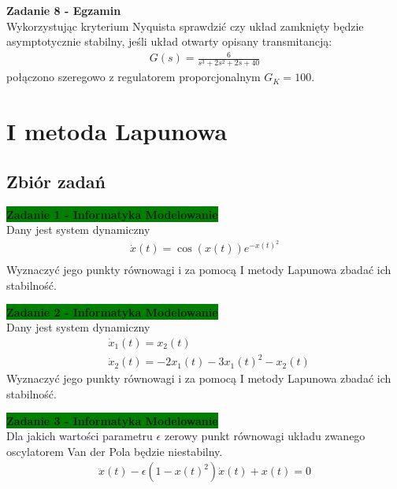 \documentclass[a4paper,11pt]{article}
\begin{document}
\newpage
\begin{framed}
\textbf{Zadanie 8 - Egzamin } \\ 
Wykorzystując kryterium Nyquista sprawdzić czy układ zamknięty będzie asymptotycznie stabilny, jeśli układ otwarty opisany transmitancją:
\begin{align*}
G(s)=\frac{6}{s^3+2s^2+2s+40}
\end{align*}
połączono szeregowo z regulatorem proporcjonalnym \( G_K = 100 \). 
\end{framed}


\newpage
\section{I metoda Lapunowa}
\subsection{Zbiór zadań}
\begin{framed}
\textbf{\colorbox{green}{Zadanie 1 - Informatyka Modelowanie} } \\ 
Dany jest system dynamiczny 
\begin{align*}
\dot{x}(t)=\cos ( x(t) ) e^{-x(t)^{2}} \\
\end{align*}
Wyznaczyć jego punkty równowagi i za pomocą I metody Lapunowa zbadać ich stabilność.
\end{framed}

\begin{framed}
\textbf{\colorbox{green}{Zadanie 2 - Informatyka Modelowanie} } \\ 
Dany jest system dynamiczny 
\begin{align*}
&\dot{x}_{1}(t)=x_{2}(t) \\
&\dot{x}_{2}(t)=-2x_{1}(t)-3x_{1}(t)^{2}-x_{2}(t)
\end{align*}
Wyznaczyć jego punkty równowagi i za pomocą I metody Lapunowa zbadać ich stabilność.
\end{framed}

\begin{framed}
\textbf{\colorbox{green}{Zadanie 3 - Informatyka Modelowanie} } \\ 
Dla jakich wartości parametru \( \epsilon \) zerowy punkt równowagi układu zwanego oscylatorem Van der Pola będzie niestabilny.  
\begin{align*}
\ddot{x}(t)- \epsilon ( 1-x(t)^{2})\dot{x}(t)+x(t) = 0
\end{align*}
\end{framed}
\end{document}
